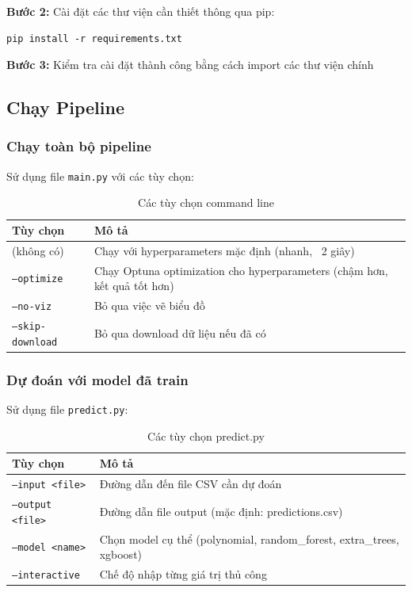 \documentclass[12pt,a4paper]{article}
\begin{document}
\textbf{Bước 2:} Cài đặt các thư viện cần thiết thông qua pip:
\begin{verbatim}
pip install -r requirements.txt
\end{verbatim}

\textbf{Bước 3:} Kiểm tra cài đặt thành công bằng cách import các thư viện chính

\subsection{Chạy Pipeline}

\subsubsection{Chạy toàn bộ pipeline}

Sử dụng file \texttt{main.py} với các tùy chọn:

\begin{table}[H]
\centering
\caption{Các tùy chọn command line}
\begin{tabular}{|l|p{8cm}|}
\hline
\textbf{Tùy chọn} & \textbf{Mô tả} \\
\hline
(không có) & Chạy với hyperparameters mặc định (nhanh, ~2 giây) \\
\hline
\texttt{--optimize} & Chạy Optuna optimization cho hyperparameters (chậm hơn, kết quả tốt hơn) \\
\hline
\texttt{--no-viz} & Bỏ qua việc vẽ biểu đồ \\
\hline
\texttt{--skip-download} & Bỏ qua download dữ liệu nếu đã có \\
\hline
\end{tabular}
\end{table}

\subsubsection{Dự đoán với model đã train}

Sử dụng file \texttt{predict.py}:

\begin{table}[H]
\centering
\caption{Các tùy chọn predict.py}
\begin{tabular}{|l|p{8cm}|}
\hline
\textbf{Tùy chọn} & \textbf{Mô tả} \\
\hline
\texttt{--input <file>} & Đường dẫn đến file CSV cần dự đoán \\
\hline
\texttt{--output <file>} & Đường dẫn file output (mặc định: predictions.csv) \\
\hline
\texttt{--model <name>} & Chọn model cụ thể (polynomial, random\_forest, extra\_trees, xgboost) \\
\hline
\texttt{--interactive} & Chế độ nhập từng giá trị thủ công \\
\hline
\end{tabular}
\end{table}
\end{document}
